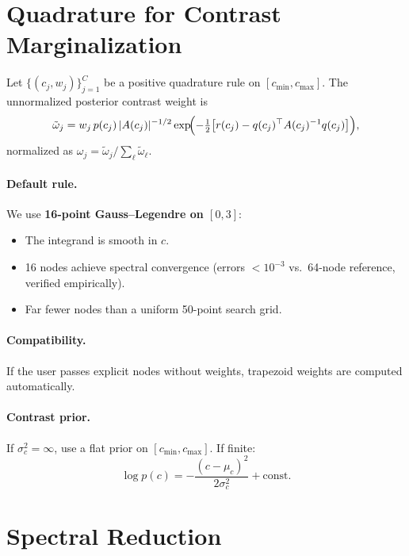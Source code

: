 \documentclass[11pt]{article}
\begin{document}
\section{Quadrature for Contrast Marginalization}
\label{sec:quadrature}

Let $\{(c_j, w_j)\}_{j=1}^C$ be a positive quadrature rule on
$[c_{\min}, c_{\max}]$.  The unnormalized posterior contrast weight is
\begin{equation}
  \tilde{\omega}_j
  = w_j \, p(c_j) \, |A(c_j)|^{-1/2}
    \exp\!\Bigl(-\tfrac{1}{2}\bigl[r(c_j) - q(c_j)^\top A(c_j)^{-1} q(c_j)
    \bigr]\Bigr),
\end{equation}
normalized as $\omega_j = \tilde{\omega}_j / \sum_\ell \tilde{\omega}_\ell$.

\paragraph{Default rule.}
We use \textbf{16-point Gauss--Legendre on $[0, 3]$}:
\begin{itemize}
  \item The integrand is smooth in $c$.
  \item 16 nodes achieve spectral convergence (errors
        $< 10^{-3}$ vs.\ 64-node reference, verified empirically).
  \item Far fewer nodes than a uniform 50-point search grid.
\end{itemize}

\paragraph{Compatibility.}  If the user passes explicit nodes without
weights, trapezoid weights are computed automatically.

\paragraph{Contrast prior.}
If $\sigma_c^2 = \infty$, use a flat prior on $[c_{\min}, c_{\max}]$.
If finite:
\begin{equation}
  \log p(c) = -\frac{(c - \mu_c)^2}{2\sigma_c^2} + \text{const}.
\end{equation}

\section{Spectral Reduction}
\label{sec:spectral}
\end{document}
